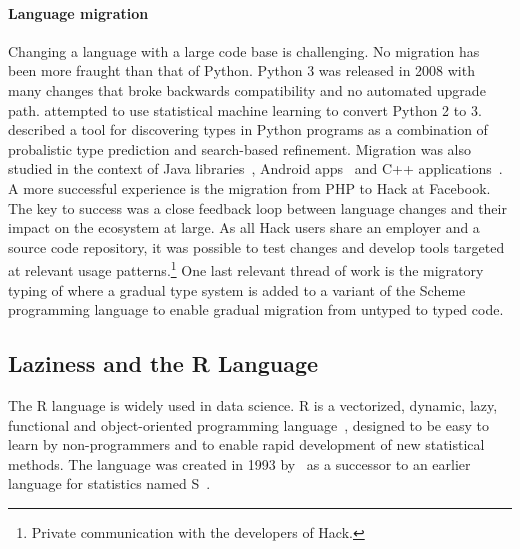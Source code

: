 \documentclass[review,nonacm,screen,acmsmall,anonymous=true]{acmart}
\begin{document}
\paragraph{Language migration} Changing a language with a large code base
is challenging. No migration has been more fraught than that of Python. Python 3
was released in 2008 with many changes that broke backwards compatibility and no
automated upgrade path. \citet{Agg15} attempted to use statistical machine
learning to convert Python 2 to 3. \citet{Pra20} described a tool for
discovering types in Python programs as a combination of probalistic type
prediction and search-based refinement. Migration was also studied in the
context of Java libraries~\cite{Xu19}, Android apps~\cite{Orso20} and C++
applications~\cite{OB20}. A more successful experience is the migration from PHP
to Hack at Facebook. The key to success was a close feedback loop between
language changes and their impact on the ecosystem at large. As all Hack users
share an employer and a source code repository, it was possible to test changes
and develop tools targeted at relevant usage patterns.\footnote{Private
  communication with the developers of Hack.} One last relevant thread of work
is the migratory typing of \citet{matthias06} where a gradual type system is
added to a variant of the Scheme programming language to enable gradual
migration from untyped to typed code.


\subsection{Laziness and the R Language}

The R language is widely used in data science. R is a vectorized, dynamic, lazy,
functional and object-oriented programming language~\cite{ecoop12}, designed to
be easy to learn by non-programmers and to enable rapid development of new
statistical methods. The language was created in 1993 by~\citet{R96} as a
successor to an earlier language for statistics named S~\cite{S88}.
\end{document}
